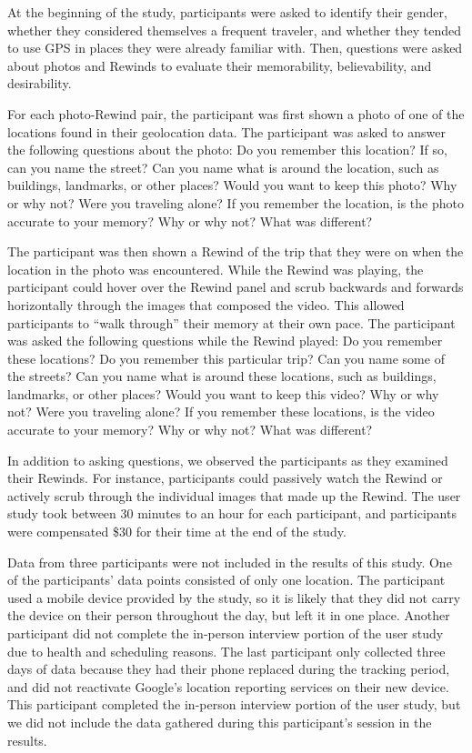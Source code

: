 \documentclass{sigchi}
\begin{document}
At the beginning of the study, participants were asked to identify their gender, whether they considered themselves a frequent traveler, and whether they tended to use GPS in places they were already familiar with. Then, questions were asked about photos and Rewinds to evaluate their memorability, believability, and desirability.

For each photo-Rewind pair, the participant was first shown a photo of one of the locations found in their geolocation data. The participant was asked to answer the following questions about the photo: Do you remember this location? If so, can you name the street? Can you name what is around the location, such as buildings, landmarks, or other places? Would you want to keep this photo? Why or why not? Were you traveling alone? If you remember the location, is the photo accurate to your memory? Why or why not? What was different?

The participant was then shown a Rewind of the trip that they were on when the location in the photo was encountered. While the Rewind was playing, the participant could hover over the Rewind panel and scrub backwards and forwards horizontally through the images that composed the video. This allowed participants to ``walk through'' their memory at their own pace. The participant was asked the following questions while the Rewind played: Do you remember these locations? Do you remember this particular trip? Can you name some of the streets? Can you name what is around these locations, such as buildings, landmarks, or other places? Would you want to keep this video? Why or why not? Were you traveling alone? If you remember these locations, is the video accurate to your memory? Why or why not? What was different?

In addition to asking questions, we observed the participants as they examined their Rewinds. For instance, participants could passively watch the Rewind or actively scrub through the individual images that made up the Rewind. The user study took between 30 minutes to an hour for each participant, and participants were compensated \$30 for their time at the end of the study.

Data from three participants were not included in the results of this study. One of the participants' data points consisted of only one location. The participant used a mobile device provided by the study, so it is likely that they did not carry the device on their person throughout the day, but left it in one place. Another participant did not complete the in-person interview portion of the user study due to health and scheduling reasons. The last participant only collected three days of data because they had their phone replaced during the tracking period, and did not reactivate Google's location reporting services on their new device. This participant completed the in-person interview portion of the user study, but we did not include the data gathered during this participant's session in the results.
\end{document}
